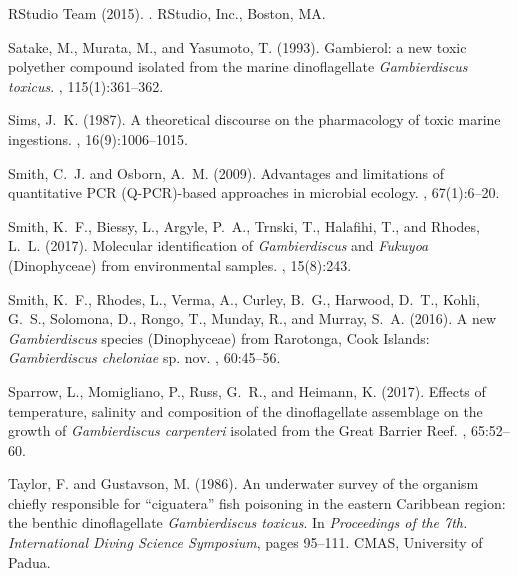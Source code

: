 \documentclass[10pt,letterpaper]{article}
\begin{document}
\begin{thebibliography}{10}
{RStudio Team} (2015).
.
\newblock RStudio, Inc., Boston, MA.

Satake, M., Murata, M., and Yasumoto, T. (1993).
\newblock Gambierol: a new toxic polyether compound isolated from the marine
  dinoflagellate \emph{Gambierdiscus toxicus}.
, 115(1):361--362.

Sims, J.~K. (1987).
\newblock A theoretical discourse on the pharmacology of toxic marine
  ingestions.
, 16(9):1006--1015.

Smith, C.~J. and Osborn, A.~M. (2009).
\newblock Advantages and limitations of quantitative {PCR} ({Q-PCR})-based
  approaches in microbial ecology.
, 67(1):6--20.

Smith, K.~F., Biessy, L., Argyle, P.~A., Trnski, T., Halafihi, T., and Rhodes,
  L.~L. (2017).
\newblock Molecular identification of \emph{Gambierdiscus} and \emph{Fukuyoa}
  ({D}inophyceae) from environmental samples.
, 15(8):243.

Smith, K.~F., Rhodes, L., Verma, A., Curley, B.~G., Harwood, D.~T., Kohli,
  G.~S., Solomona, D., Rongo, T., Munday, R., and Murray, S.~A. (2016).
\newblock A new \emph{Gambierdiscus} species ({D}inophyceae) from {R}arotonga,
  {C}ook {I}slands: \emph{Gambierdiscus cheloniae} sp. nov.
, 60:45--56.

Sparrow, L., Momigliano, P., Russ, G.~R., and Heimann, K. (2017).
\newblock Effects of temperature, salinity and composition of the
  dinoflagellate assemblage on the growth of \emph{Gambierdiscus carpenteri}
  isolated from the {G}reat {B}arrier {R}eef.
, 65:52--60.

Taylor, F. and Gustavson, M. (1986).
\newblock An underwater survey of the organism chiefly responsible for
  “ciguatera” fish poisoning in the eastern {C}aribbean region: the benthic
  dinoflagellate \emph{Gambierdiscus toxicus}.
\newblock In {\em Proceedings of the 7th. International Diving Science
  Symposium}, pages 95--111. CMAS, University of Padua.


\end{thebibliography}
\end{document}
